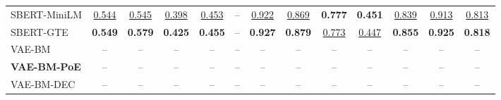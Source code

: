 \begin{table}[t]
{\begin{tabular}{lcccccccccccc}
SBERT-MiniLM & \underline{0.544} & \underline{0.545} & \underline{0.398} & \underline{0.453} & -- & \underline{0.922} & \underline{0.869} & \textbf{0.777} & \textbf{0.451} & \underline{0.839} & \underline{0.913} & \underline{0.813} \\
SBERT-GTE & \textbf{0.549} & \textbf{0.579} & \textbf{0.425} & \textbf{0.455} & -- & \textbf{0.927} & \textbf{0.879} & \underline{0.773} & \underline{0.447} & \textbf{0.855} & \textbf{0.925} & \textbf{0.818} \\
\midrule
VAE-BM & -- & -- & -- & -- & -- & -- & -- & -- & -- & -- & -- & -- \\
\textbf{VAE-BM-PoE} & -- & -- & -- & -- & -- & -- & -- & -- & -- & -- & -- & -- \\
VAE-BM-DEC & -- & -- & -- & -- & -- & -- & -- & -- & -- & -- & -- & -- \\
\bottomrule
\end{tabular}
}
\end{table}
